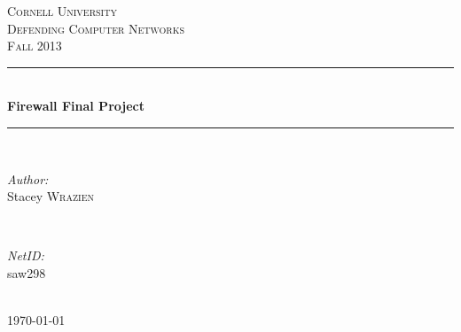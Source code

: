 \documentclass[12pt]{article} %
\begin{document}

\begin{titlepage}

\newcommand{\HRule}{\rule{\linewidth}{0.5mm}} %

\center %

\textsc{\LARGE Cornell University}\\[1.5cm] %
\textsc{\Large Defending Computer Networks}\\[0.5cm] %
\textsc{\large Fall 2013}\\[0.5cm] %

\HRule \\[0.4cm]
{ \huge \bfseries Firewall Final Project}\\[0.4cm] %
\HRule \\[1.5cm]

\begin{minipage}{0.4\textwidth}
\begin{flushleft} \large
\emph{Author:}\\
Stacey \textsc{Wrazien} %
\end{flushleft}
\end{minipage}
~
\begin{minipage}{0.4\textwidth}
\begin{flushright} \large
\emph{NetID:} \\
saw298 %
\end{flushright}
\end{minipage}\\[4cm]

{\large \today}\\[3cm] %


\vfill %

\end{titlepage}

\end{document}
